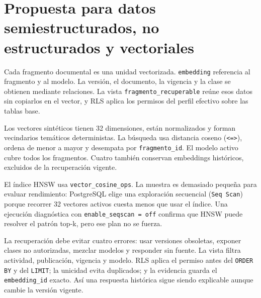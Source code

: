 \section{Propuesta para datos semiestructurados, no estructurados y vectoriales}

Cada fragmento documental es una unidad vectorizada. \texttt{embedding}
referencia al fragmento y al modelo. La versión, el documento, la vigencia y la
clase se obtienen mediante relaciones. La vista
\texttt{fragmento\_recuperable} reúne esos datos sin copiarlos en el vector, y
RLS aplica los permisos del perfil efectivo sobre las tablas base.

Los vectores sintéticos tienen 32 dimensiones, están normalizados y forman
vecindarios temáticos deterministas. La búsqueda usa distancia coseno
(\texttt{<=>}), ordena de menor a mayor y desempata por
\texttt{fragmento\_id}. El modelo activo cubre todos los fragmentos. Cuatro
también conservan embeddings históricos, excluidos de la recuperación vigente.

El índice HNSW usa \texttt{vector\_cosine\_ops}. La muestra es demasiado
pequeña para evaluar rendimiento: PostgreSQL elige una exploración secuencial
(\texttt{Seq Scan}) porque recorrer 32 vectores activos cuesta menos que usar el
índice. Una ejecución diagnóstica con \texttt{enable\_seqscan = off} confirma
que HNSW puede resolver el patrón top-k, pero ese plan no se fuerza.

La recuperación debe evitar cuatro errores: usar versiones obsoletas, exponer
clases no autorizadas, mezclar modelos y responder sin fuente. La vista filtra
actividad, publicación, vigencia y modelo. RLS aplica el permiso antes del
\texttt{ORDER BY} y del \texttt{LIMIT}; la unicidad evita duplicados; y la
evidencia guarda el \texttt{embedding\_id} exacto. Así una respuesta histórica
sigue siendo explicable aunque cambie la versión vigente.
